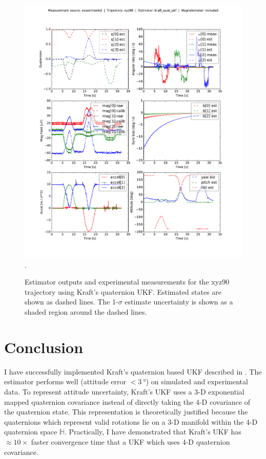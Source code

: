 \documentclass[conference]{IEEEtran}
\begin{document}
\begin{figure}[!t]
  \centering
  \includegraphics[width=7.5in]{figures/est_result_pickle_xyz90_kraft_quat_ukf_mag.pdf}
  \DeclareGraphicsExtensions.
  \caption{Estimator outputs and experimental measurements for the xyz90 trajectory using Kraft's quaternion UKF. Estimated states are shown as dashed lines. The 1-$\sigma$ estimate uncertainty is shown as a shaded region around the dashed lines.}
  \label{fig:est_result_pickle_xyz90_kraft_quat_ukf_mag}
\end{figure}


\section{Conclusion}
I have successfully implemented Kraft's quaternion based UKF described in \cite{1257247}. The estimator performs well (attitude error $< \SI{3}{\degree}$) on simulated and experimental data. To represent attitude uncertainty, Kraft's UKF uses a 3-D exponential mapped quaternion covariance instead of directly taking the 4-D covariance of the quaternion state. This representation is theoretically justified because the quaternions which represent valid rotations lie on a 3-D manifold within the 4-D quaternion space $\mathbb{H}$. Practically, I have demonstrated that Kraft's UKF has $\approx 10 \times$ faster convergence time that a UKF which uses 4-D quaternion covariance.\\
\end{document}
